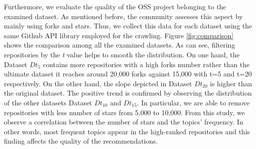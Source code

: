  
Furthermore, we evaluate the quality of the OSS project belonging to the examined dataset. As mentioned before, the \GH community assesses this aspect by mainly using forks and stars. Thus, we collect this data for each dataset using the same Github API library employed for the crawling. Figure \ref{fig:comparison} shows the comparison among all the examined datasets. As can see, filtering repositories by the \emph{t} value helps to smooth the distribution. On one hand, the Dataset $Dt_5$ contains more repositories with a high forks number rather than the ultimate dataset \ie it reaches around 20,000 forks against 15,000 with t=5 and t=20 respectively. On the other hand, the slope depicted in Dataset $Dt_{20}$ is higher than the original dataset. The positive trend is confirmed by observing the distribution of the other datasets \ie Dataset $Dt_{10}$ and $Dt_{15}$. In particular, we are able to remove repositories with less number of stars \ie from 5,000 to 10,000. 
From this study, we observe a correlation between the number of stars and the topics' frequency. In other words, most frequent topics appear in the high-ranked repositories and this finding affects the quality of the recommendations. 







